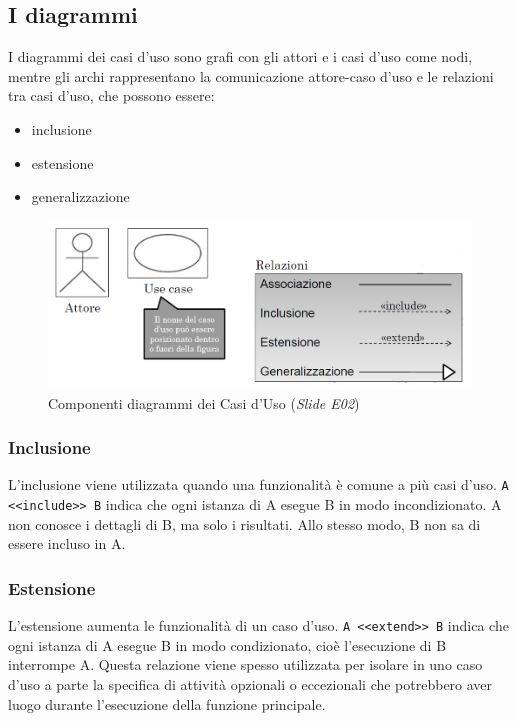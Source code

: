 \subsection{I diagrammi}

I diagrammi dei casi d'uso sono grafi con gli attori e i casi d'uso come nodi, mentre gli archi rappresentano la comunicazione attore-caso d'uso e le relazioni tra casi d'uso, che possono essere:
\begin{itemize}
\item inclusione
\item estensione
\item generalizzazione
\end{itemize}

\begin{figure}[H]
    \includegraphics[width=1\textwidth]{res/img/componentiUseCaseDiagram}
    \caption{Componenti diagrammi dei Casi d'Uso (\textit{Slide E02})}
\end{figure}

\subsubsection{Inclusione}
L'inclusione viene utilizzata quando una funzionalità è comune a più casi d'uso. 
\texttt{A <<include>> B} indica che ogni istanza di A esegue B in modo incondizionato. 
A non conosce i dettagli di B, ma solo i risultati. Allo stesso modo, B non sa di essere incluso in A.

\subsubsection{Estensione}
L'estensione aumenta le funzionalità di un caso d'uso. 
\texttt{A <<extend>> B} indica che ogni istanza di A esegue B in modo condizionato, cioè l'esecuzione di B interrompe A.
Questa relazione viene spesso utilizzata per isolare in uno caso d'uso a parte la specifica di attività opzionali 
o eccezionali che potrebbero aver luogo durante l'esecuzione della funzione principale.

